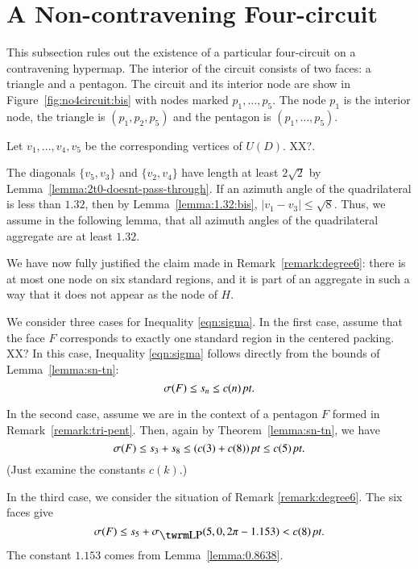 
\section{A Non-contravening Four-circuit}
\label{sec:impossible-circuit}

This subsection rules out the existence of a particular four-circuit
on a contravening hypermap.  The interior of the circuit consists of
two faces: a triangle and a pentagon.  The circuit and its interior
node are show in Figure~\ref{fig:no4circuit:bis} with nodes marked
$p_1,\ldots,p_5$. The node $p_1$ is the interior node, the triangle
is $(p_1,p_2,p_5)$ and the pentagon is $(p_1,\ldots,p_5)$.


Let $v_1,\ldots,v_4,v_5$ be the corresponding vertices of $U(D)$.
XX?.

The diagonals $\{v_5,v_3\}$ and $\{v_2,v_4\}$ have length at least
$2\sqrt2$ by Lemma~\ref{lemma:2t0-doesnt-pass-through}.  If an
azimuth angle of the  quadrilateral is less than $1.32$, then by
Lemma~\ref{lemma:1.32:bis},  $|v_1-v_3|\le\sqrt{8}$.  Thus, we
assume in the following lemma, that all azimuth angles of the
quadrilateral aggregate are at least $1.32$.


\begin{remark}
We have now fully justified the claim made in
Remark~\ref{remark:degree6}: there is at most one node on six
standard regions, and it is part of an aggregate in such a way that
it does not appear as the node of $H$.
\end{remark}



We consider three cases for Inequality \ref{eqn:sigma}. In the
first case, assume that the face $F$ corresponds to exactly one
standard region in the centered packing.  XX? In this case,
Inequality \ref{eqn:sigma} follows directly from the bounds of
Lemma~\ref{lemma:sn-tn}:
    $$\sigma(F)\le s_n \le c(n)\,\hbox{\it pt}.$$

In the second case, assume we are in the context of a pentagon $F$
formed in Remark~\ref{remark:tri-pent}.  Then, again by
Theorem~\ref{lemma:sn-tn}, we have
$$\sigma(F) \le s_3+s_8\le (c(3)+c(8))\,\hbox{\it pt} \le c(5)\,\hbox{\it pt}.$$
(Just examine the constants $c(k)$.)

In the third case, we consider the situation of Remark
\ref{remark:degree6}.  The six faces give
$$\sigma(F)\le s_5+\sLP(5,0,2\pi-1.153)< c(8)\,\pt.$$
The constant $1.153$ comes from Lemma~\ref{lemma:0.8638}.


